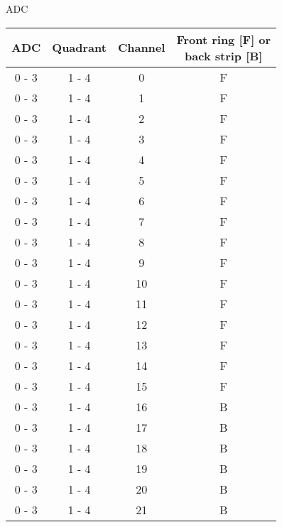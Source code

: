 \caption{ADC}
\label{tab:ADC}
\begin{tabular}{cccc}
\hline
ADC    & Quadrant & Channel &  \shortstack{Front ring [F] or \\ back strip [B]} \\
\hline
0 - 3  &  1 - 4   &  0      &  F                    		   					\\
0 - 3  &  1 - 4   &  1      &  F                    		   					\\
0 - 3  &  1 - 4   &  2      &  F                    		   					\\
0 - 3  &  1 - 4   &  3      &  F                    		   					\\
0 - 3  &  1 - 4   &  4      &  F                    		   					\\
0 - 3  &  1 - 4   &  5      &  F                    		   					\\
0 - 3  &  1 - 4   &  6      &  F                    		   					\\
0 - 3  &  1 - 4   &  7      &  F                    		   					\\
0 - 3  &  1 - 4   &  8      &  F                    		   					\\
0 - 3  &  1 - 4   &  9      &  F                    		   					\\
0 - 3  &  1 - 4   &  10     &  F                    		   					\\
0 - 3  &  1 - 4   &  11     &  F                    		   					\\
0 - 3  &  1 - 4   &  12     &  F                    		   					\\
0 - 3  &  1 - 4   &  13     &  F                    		   					\\
0 - 3  &  1 - 4   &  14     &  F                    		   					\\
0 - 3  &  1 - 4   &  15     &  F                    		   					\\
0 - 3  &  1 - 4   &  16     &  B                    		   					\\
0 - 3  &  1 - 4   &  17     &  B                    		   					\\
0 - 3  &  1 - 4   &  18     &  B                    		   					\\
0 - 3  &  1 - 4   &  19     &  B                    		   					\\
0 - 3  &  1 - 4   &  20     &  B                    		   					\\
0 - 3  &  1 - 4   &  21     &  B                    		   					\\

\end{tabular}
